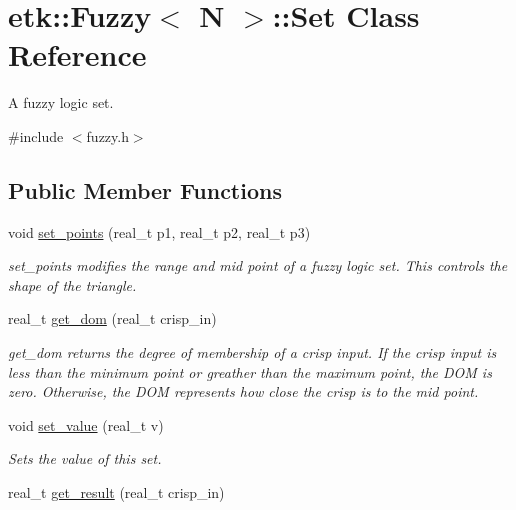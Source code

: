 \hypertarget{classetk_1_1_fuzzy_1_1_set}{\section{etk\-:\-:Fuzzy$<$ N $>$\-:\-:Set Class Reference}
\label{classetk_1_1_fuzzy_1_1_set}
}


A fuzzy logic set.  




{\ttfamily \#include $<$fuzzy.\-h$>$}

\subsection*{Public Member Functions}
\begin{DoxyCompactItemize}
\item 
void \hyperlink{classetk_1_1_fuzzy_1_1_set_a25e0d7c7387af6967af45fad4830ff6e}{set\-\_\-points} (real\-\_\-t p1, real\-\_\-t p2, real\-\_\-t p3)
\begin{DoxyCompactList}\small\item\em set\-\_\-points modifies the range and mid point of a fuzzy logic set. This controls the shape of the triangle. \end{DoxyCompactList}\item 
real\-\_\-t \hyperlink{classetk_1_1_fuzzy_1_1_set_a00eea0cf95bc9b740e431e924f51c700}{get\-\_\-dom} (real\-\_\-t crisp\-\_\-in)
\begin{DoxyCompactList}\small\item\em get\-\_\-dom returns the degree of membership of a crisp input. If the crisp input is less than the minimum point or greather than the maximum point, the D\-O\-M is zero. Otherwise, the D\-O\-M represents how close the crisp is to the mid point. \end{DoxyCompactList}\item 
\hypertarget{classetk_1_1_fuzzy_1_1_set_a59cab70b072060b45a476615134f7e39}{void \hyperlink{classetk_1_1_fuzzy_1_1_set_a59cab70b072060b45a476615134f7e39}{set\-\_\-value} (real\-\_\-t v)}\label{classetk_1_1_fuzzy_1_1_set_a59cab70b072060b45a476615134f7e39}

\begin{DoxyCompactList}\small\item\em Sets the value of this set. \end{DoxyCompactList}\item 
\hypertarget{classetk_1_1_fuzzy_1_1_set_a81e85261c9d694909f48df074b3f9a01}{real\-\_\-t \hyperlink{classetk_1_1_fuzzy_1_1_set_a81e85261c9d694909f48df074b3f9a01}{get\-\_\-result} (real\-\_\-t crisp\-\_\-in)}\label{classetk_1_1_fuzzy_1_1_set_a81e85261c9d694909f48df074b3f9a01}


\end{DoxyCompactItemize}
